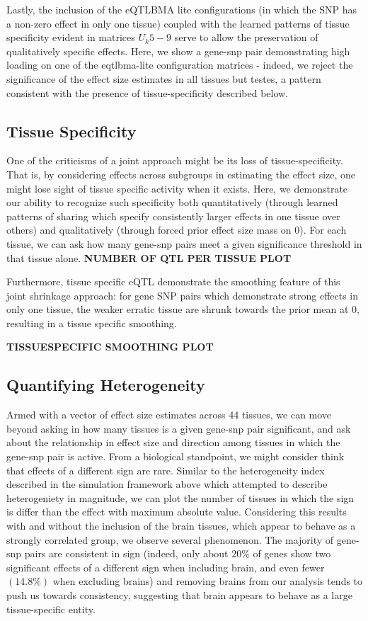 Lastly, the inclusion of the eQTLBMA lite configurations (in which the SNP has a non-zero effect in only one tissue) coupled with the learned patterns of tissue specificity evident in matrices $U_{k}5-9$ serve to allow the preservation of qualitatively specific effects. Here, we show a gene-snp pair demonstrating high loading on one of the eqtlbma-lite configuration matrices - indeed, we reject the significance of the effect size estimates in all tissues but testes, a pattern consistent with the presence of tissue-specificity described below.


\subsection{Tissue Specificity}

One of the criticisms of a joint approach might be its loss of tissue-specificity. That is, by considering effects across subgroups in estimating the effect size, one might lose sight of tissue specific activity when it exists. Here, we demonstrate our ability to recognize such specificity both quantitatively (through learned patterns of sharing which specify consistently larger effects in one tissue over others) and qualitatively (through forced prior effect size mass on 0).  For each tissue, we can ask how many gene-snp pairs meet a given significance threshold in that tissue alone. 
\textbf{NUMBER OF QTL PER TISSUE PLOT}

Furthermore, tissue specific eQTL demonstrate the smoothing feature of this joint shrinkage approach: for gene SNP pairs which demonstrate strong effects in only one tissue, the weaker erratic tissue are shrunk towards the prior mean at 0, resulting in a tissue specific smoothing.

\textbf{TISSUESPECIFIC SMOOTHING PLOT}

\subsection{Quantifying Heterogeneity}


Armed with a vector of effect size estimates across 44 tissues, we can move beyond asking in how many tissues is a given gene-snp pair significant, and ask about the relationship in effect size and direction among tissues in which the gene-snp pair is active. From a biological standpoint, we might consider think that effects of a different sign are rare. Similar to the heterogeneity index described in the simulation framework above which attempted to describe heterogeniety in magnitude, we can plot the number of tissues in which the sign is differ than the effect with maximum absolute value. Considering this results with and without the inclusion of the brain tissues, which appear to behave as a strongly correlated group, we observe several phenomenon. The majority of gene-snp pairs are consistent in sign (indeed, only about $20\%$ of genes show two significant effects of a different sign when including brain, and even fewer $(14.8\%)$ when excluding brains) and removing brains from our analysis tends to push us towards consistency, suggesting that brain appears to behave as a large tissue-specific entity.



